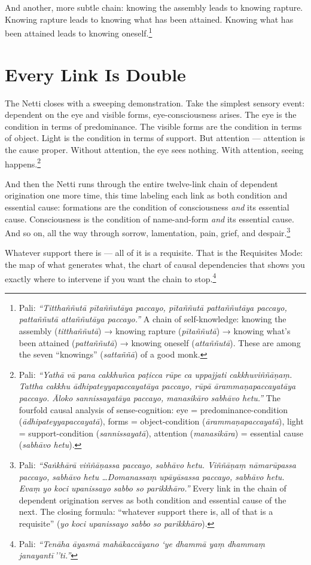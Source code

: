 And another, more subtle chain: knowing the assembly leads to knowing rapture. Knowing rapture leads to knowing what has been attained. Knowing what has been attained leads to knowing oneself.\footnote{Pali: \textit{``Titthaññutā pītaññutāya paccayo, pītaññutā pattaññutāya paccayo, pattaññutā attaññutāya paccayo.''} A chain of self-knowledge: knowing the assembly (\textit{titthaññutā}) → knowing rapture (\textit{pītaññutā}) → knowing what's been attained (\textit{pattaññutā}) → knowing oneself (\textit{attaññutā}). These are among the seven ``knowings'' (\textit{sattaññā}) of a good monk.}

\section*{Every Link Is Double}

The Netti closes with a sweeping demonstration. Take the simplest sensory event: dependent on the eye and visible forms, eye-consciousness arises. The eye is the condition in terms of predominance. The visible forms are the condition in terms of object. Light is the condition in terms of support. But attention --- attention is the cause proper. Without attention, the eye sees nothing. With attention, seeing happens.\footnote{Pali: \textit{``Yathā vā pana cakkhuñca paṭicca rūpe ca uppajjati cakkhuviññāṇaṃ. Tattha cakkhu ādhipateyyapaccayatāya paccayo, rūpā ārammaṇapaccayatāya paccayo. Āloko sannissayatāya paccayo, manasikāro sabhāvo hetu.''} The fourfold causal analysis of sense-cognition: eye = predominance-condition (\textit{ādhipateyyapaccayatā}), forms = object-condition (\textit{ārammaṇapaccayatā}), light = support-condition (\textit{sannissayatā}), attention (\textit{manasikāra}) = essential cause (\textit{sabhāvo hetu}).}

And then the Netti runs through the entire twelve-link chain of dependent origination one more time, this time labeling each link as both condition and essential cause: formations are the condition of consciousness \textit{and} its essential cause. Consciousness is the condition of name-and-form \textit{and} its essential cause. And so on, all the way through sorrow, lamentation, pain, grief, and despair.\footnote{Pali: \textit{``Saṅkhārā viññāṇassa paccayo, sabhāvo hetu. Viññāṇaṃ nāmarūpassa paccayo, sabhāvo hetu \ldots Domanassaṃ upāyāsassa paccayo, sabhāvo hetu. Evaṃ yo koci upanissayo sabbo so parikkhāro.''} Every link in the chain of dependent origination serves as both condition and essential cause of the next. The closing formula: ``whatever support there is, all of that is a requisite'' (\textit{yo koci upanissayo sabbo so parikkhāro}).}

Whatever support there is --- all of it is a requisite. That is the Requisites Mode: the map of what generates what, the chart of causal dependencies that shows you exactly where to intervene if you want the chain to stop.\footnote{Pali: \textit{``Tenāha āyasmā mahākaccāyano `ye dhammā yaṃ dhammaṃ janayantī\,''ti.''}}
